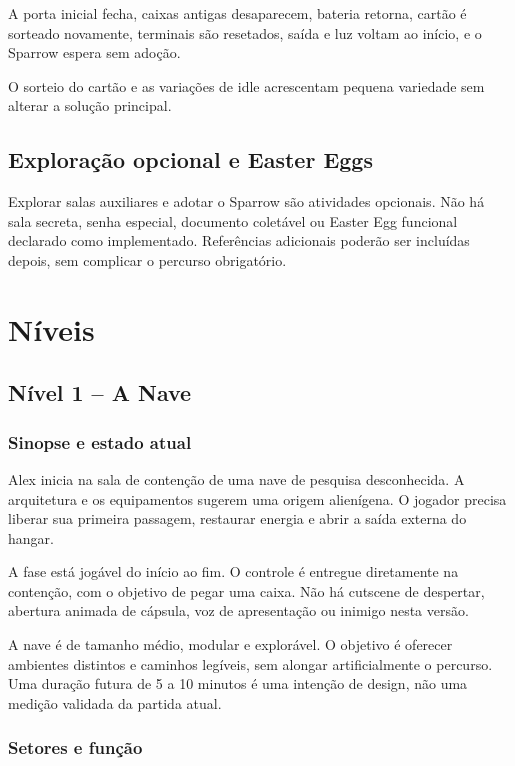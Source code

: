 \documentclass[12pt,a4paper]{article}
\begin{document}
A porta inicial fecha, caixas antigas desaparecem, bateria retorna,
cartão é sorteado novamente, terminais são resetados, saída e luz
voltam ao início, e o Sparrow espera sem adoção.

O sorteio do cartão e as variações de idle acrescentam pequena
variedade sem alterar a solução principal.

\subsection{Exploração opcional e Easter Eggs}

Explorar salas auxiliares e adotar o Sparrow são atividades opcionais.
Não há sala secreta, senha especial, documento coletável ou Easter Egg
funcional declarado como implementado. Referências adicionais poderão
ser incluídas depois, sem complicar o percurso obrigatório.



\section{Níveis}

\subsection{Nível 1 -- A Nave}

\subsubsection*{Sinopse e estado atual}

Alex inicia na sala de contenção de uma nave de pesquisa desconhecida.
A arquitetura e os equipamentos sugerem uma origem alienígena.
O jogador precisa liberar sua primeira passagem, restaurar energia
e abrir a saída externa do hangar.

A fase está jogável do início ao fim. O controle é entregue
diretamente na contenção, com o objetivo de pegar uma caixa.
Não há cutscene de despertar, abertura animada de cápsula,
voz de apresentação ou inimigo nesta versão.

A nave é de tamanho médio, modular e explorável. O objetivo é
oferecer ambientes distintos e caminhos legíveis, sem alongar
artificialmente o percurso. Uma duração futura de 5 a 10 minutos
é uma intenção de design, não uma medição validada da partida atual.

\subsubsection*{Setores e função}
\end{document}
